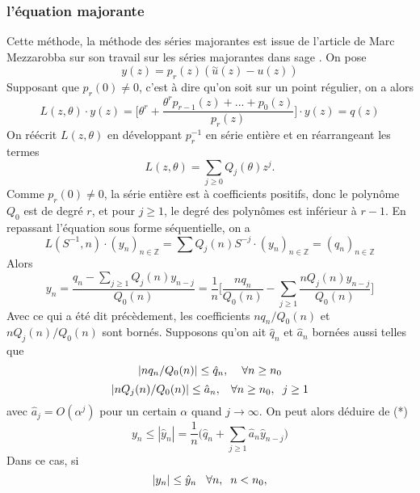 \documentclass[a4paper,10.5pt]{article}
\begin{document}
	\subsubsection{l'équation majorante}
	Cette méthode, la méthode des séries majorantes est issue de l'article de Marc Mezzarobba sur son travail sur les séries majorantes dans sage \cite{mezzarobba2019truncation}. 
	On pose
	\[y(z)=p_r(z)(\overset{\sim}{u}(z)-u(z))\]
	Supposant que $p_r(0) \neq 0$, c'est à dire qu'on soit sur un point régulier, on a alors 
	\[L(z,\theta)\cdot y(z)=\Big[\theta^{r}+\frac{\theta^{r}p_{r-1}(z)+...+p_0(z)}{p_r(z)}\Big]\cdot y(z)=q(z)\]
	On réécrit $L(z,\theta)$ en développant $p_r^{-1}$ en série entière et en réarrangeant les termes
	\[L(z,\theta)=\sum_{j\geq 0} Q_{j}(\theta)z^j.\]
	Comme $p_r(0)\neq 0$, la série entière est à coefficients positifs, donc le polynôme $Q_0$ est de degré $r$, et pour $j \geq 1$, le degré des polynômes est inférieur à $r-1$.
	En repassant l'équation sous forme séquentielle, on a 
	\[L(S^{-1},n)\cdot (y_n)_{n \in \mathbb{Z}}=\sum Q_j(n)S^{-j} \cdot  (y_n)_{n \in \mathbb{Z}} =(q_n)_{n \in \mathbb{Z}} \]
	Alors
	\[y_n=\frac{q_n-\sum_{j\geq1}Q_j(n)y_{n-j}}{Q_0(n)}= \frac{1}{n}\Big[\frac{nq_n}{Q_0(n)}-\sum_{j\geq1}\frac{nQ_j(n)y_{n-j}}{Q_0(n)}\Big]\tag{*}\]
	Avec ce qui a été dit précèdement, les coefficients $nq_n/Q_0(n)$ et $nQ_j(n)/Q_0(n)$ sont bornés.
	Supposons qu'on ait $\hat{q}_n$ et $\hat{a}_n$ bornées aussi telles que
	\begin{equation}
	|nq_n/Q_0(n)|\leq \hat{q}_n,  \hspace{4mm}\forall n\geq n_0
	\label{maj1}
	\end{equation}
	\begin{equation}
	|nQ_j(n)/Q_0(n)|\leq \hat{a}_n,\hspace{3mm}  \forall n\geq n_0, \hspace{2mm} j\geq 1
	\label{maj2}
	\end{equation}
	avec $\hat{a}_j=O(\alpha^j)$ pour un certain $\alpha$ quand $j \rightarrow \infty$. On peut alors déduire de (*)
	\begin{equation}
	y_n\leq|\hat{y}_n|=\frac{1}{n}\Big(\hat{q}_n+\sum_{j\geq1}\hat{a}_{n}\hat{y}_{n-j}\Big)
	\label{majrec}
	\end{equation}
	Dans ce cas, si 
	\begin{equation}
	|y_n|\leq \hat{y}_n \hspace{3mm} \forall n, \hspace{2mm} n<n_0,
	\label{maj3}
	\end{equation}
	
\end{document}
